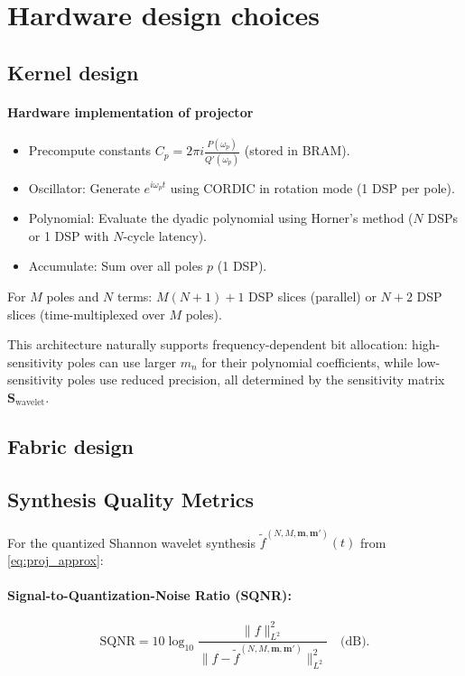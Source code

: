 \section{Hardware design choices}\label{app:hardware}

\subsection{Kernel design}

\paragraph{Hardware implementation of projector}
\begin{itemize}
\item Precompute constants $C_p = 2\pi i \frac{P(\omega_p)}{Q'(\omega_p)}$ (stored in BRAM).
\item Oscillator: Generate $e^{i\omega_p t}$ using CORDIC in rotation mode (1 DSP per pole).
\item Polynomial: Evaluate the dyadic polynomial using Horner's method ($N$ DSPs or 1 DSP with $N$-cycle latency).
\item Accumulate: Sum over all poles $p$ (1 DSP).
\end{itemize}

For $M$ poles and $N$ terms: $M(N+1) + 1$ DSP slices (parallel) or $N+2$ DSP slices (time-multiplexed over $M$ poles).

This architecture naturally supports frequency-dependent bit allocation: high-sensitivity poles can use larger $m_n$ for their polynomial coefficients, while low-sensitivity poles use reduced precision, all determined by the sensitivity matrix $\mathbf{S}_{\text{wavelet}}$.

\subsection{Fabric design}

\subsection{Synthesis Quality Metrics}

For the quantized Shannon wavelet synthesis $\widetilde{f}^{(N,M,\mathbf{m},\mathbf{m}')}(t)$ from \eqref{eq:proj_approx}:

\paragraph{Signal-to-Quantization-Noise Ratio (SQNR):}
\[
\text{SQNR} = 10 \log_{10} \frac{\|f\|_{L^2}^2}{\|f - \widetilde{f}^{(N,M,\mathbf{m},\mathbf{m}')}\|_{L^2}^2} \quad \text{(dB)}.
\]

